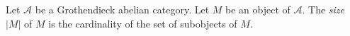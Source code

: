 \begin{definition}
\label{definition-size}
Let $\mathcal{A}$ be a Grothendieck abelian category.
Let $M$ be an object of $\mathcal{A}$.
The {\it size} $|M|$ of $M$ is the cardinality of the set of subobjects
of $M$.
\end{definition}